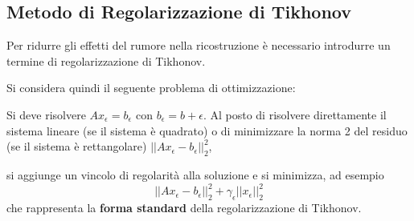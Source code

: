 \subsection{Metodo di Regolarizzazione di Tikhonov}
Per ridurre gli effetti del rumore nella ricostruzione è necessario introdurre un termine di regolarizzazione di Tikhonov. 

Si considera quindi il seguente problema di ottimizzazione:

Si deve risolvere $Ax_\epsilon = b_\epsilon$ con $b_\epsilon = b+\epsilon$. 
Al posto di risolvere direttamente il sistema lineare (se il sistema è quadrato) o di minimizzare la norma 2 del residuo 
(se il sistema è rettangolare)  $||Ax_\epsilon -b_\epsilon||_2^2$, %

si aggiunge un vincolo di regolarità alla soluzione e si minimizza, ad esempio 
\[||Ax_\epsilon-b_\epsilon||_2^2+\gamma_\epsilon||x_\epsilon||_2^2\] che rappresenta la \textbf{forma standard} 
della regolarizzazione di Tikhonov.

